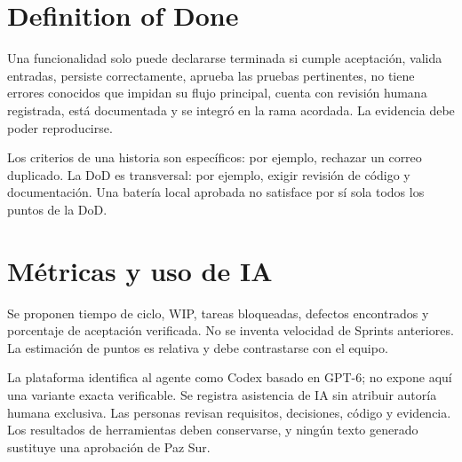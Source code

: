 \section{Definition of Done}
Una funcionalidad solo puede declararse terminada si cumple aceptación, valida entradas, persiste correctamente, aprueba las pruebas pertinentes, no tiene errores conocidos que impidan su flujo principal, cuenta con revisión humana registrada, está documentada y se integró en la rama acordada. La evidencia debe poder reproducirse.

Los criterios de una historia son específicos: por ejemplo, rechazar un correo duplicado. La DoD es transversal: por ejemplo, exigir revisión de código y documentación. Una batería local aprobada no satisface por sí sola todos los puntos de la DoD.

\section{Métricas y uso de IA}
Se proponen tiempo de ciclo, WIP, tareas bloqueadas, defectos encontrados y porcentaje de aceptación verificada. No se inventa velocidad de Sprints anteriores. La estimación de puntos es relativa y debe contrastarse con el equipo.

La plataforma identifica al agente como Codex basado en GPT-6; no expone aquí una variante exacta verificable. Se registra asistencia de IA sin atribuir autoría humana exclusiva. Las personas revisan requisitos, decisiones, código y evidencia. Los resultados de herramientas deben conservarse, y ningún texto generado sustituye una aprobación de Paz Sur.
